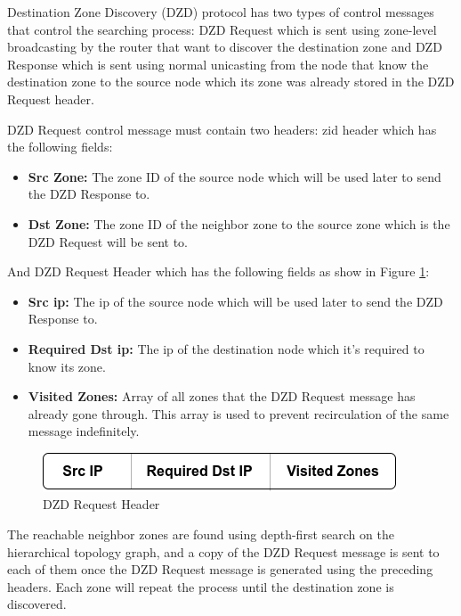 Destination Zone Discovery (DZD) protocol has two types of control messages that control the searching process: DZD Request which is sent using zone-level broadcasting by the router that want to discover the destination zone and DZD Response which is sent using normal unicasting from the node that know the destination zone to the source node which its zone was already stored in the DZD Request header. 

DZD Request control message must contain two headers: 
\acrshort{zid} header which has the following fields:
\begin{itemize}[itemsep=1pt, topsep=5pt]
    \item \textbf{Src Zone:} The zone ID of the source node which will be used later to send the DZD Response to.
    \item \textbf{Dst Zone:} The zone ID of the neighbor zone to the source zone which is the DZD Request will be sent to.
\end{itemize} 

And DZD Request Header which has the following fields as show in Figure \ref{fig:dzd-request}:
\begin{itemize}[itemsep=1pt, topsep=5pt]
    \item \textbf{Src \acrshort{ip}:} The \acrshort{ip} of the source node which will be used later to send the DZD Response to.
    \item \textbf{Required Dst \acrshort{ip}:} The \acrshort{ip} of the destination node which it's required to know its zone.
    \item \textbf{Visited Zones:} Array of all zones that the DZD Request message has already gone through. This array is used to prevent recirculation of the same message indefinitely. 
\end{itemize} 

\begin{figure}[!htb]
    \centering
    \includegraphics[scale=0.7]{images/dzdrequest_header.png}
    \caption{DZD Request Header}
    \label{fig:dzd-request}
\end{figure} 

The reachable neighbor zones are found using depth-first search on the hierarchical topology graph, and a copy of the DZD Request message is sent to each of them once the DZD Request message is generated using the preceding headers. Each zone will repeat the process until the destination zone is discovered.

